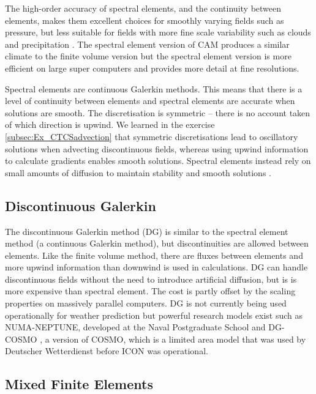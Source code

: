 The high-order accuracy of spectral elements, and the continuity between
elements, makes them excellent choices for smoothly varying fields
such as pressure, but less suitable for fields with more fine scale
variability such as clouds and precipitation \citep{WTB+07}. The
spectral element version of CAM produces a similar climate to the
finite volume version \citep{ELM+13} but the spectral element version
is more efficient on large super computers and provides more detail
at fine resolutions. 

Spectral elements are continuous Galerkin methods. This means that
there is a level of continuity between elements and spectral elements
are accurate when solutions are smooth. The discretisation is symmetric
-- there is no account taken of which direction is upwind. We learned
in the exercise \ref{subsec:Ex_CTCSadvection} that symmetric discretisations
lead to oscillatory solutions when advecting discontinuous fields,
whereas using upwind information to calculate gradients enables smooth
solutions. Spectral elements instead rely on small amounts of diffusion
to maintain stability and smooth solutions \citep{GTU+14}.

\subsection{Discontinuous Galerkin}

The discontinuous Galerkin method (DG) is similar to the spectral
element method (a continuous Galerkin method), but discontinuities
are allowed between elements. Like the finite volume method, there
are fluxes between elements and more upwind information than downwind
is used in calculations. DG can handle discontinuous fields without
the need to introduce artificial diffusion, but is is more expensive
than spectral element. The cost is partly offset by the scaling properties
on massively parallel computers. DG is not currently being used operationally
for weather prediction but powerful research models exist such as
NUMA-NEPTUNE, \citep{KG12} developed at the Naval Postgraduate School
and DG-COSMO \citep{SBB+14}, a version of COSMO, which is a limited
area model that was used by Deutscher Wetterdienst before ICON was
operational.

\subsection{Mixed Finite Elements}\label{subsec:mixedFEM}


